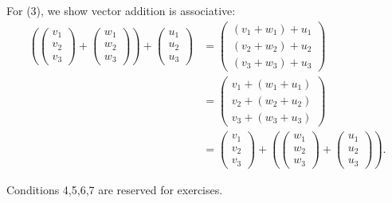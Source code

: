 \begin {example}{}
For (3), we show vector addition is associative:
\begin{align*}
\left( \left(\begin{array}{c}v_1\\v_2\\v_3\end{array}\right) + \left(\begin{array}{c}w_1\\w_2\\w_3\end{array}\right) \right) + \left(\begin{array}{c}u_1\\u_2\\u_3\end{array}\right) &= \left(\begin{array}{c}(v_1+w_1)+u_1\\(v_2+w_2)+u_2\\(v_3+w_3)+u_3\end{array}\right) \\
&= \left(\begin{array}{c}v_1+(w_1+u_1)\\v_2+(w_2+u_2)\\v_3+(w_3+u_3)\end{array}\right) \\
& =  \left(\begin{array}{c}v_1\\v_2\\v_3\end{array}\right) + \left( \left(\begin{array}{c}w_1\\w_2\\w_3\end{array}\right)   + \left(\begin{array}{c}u_1\\u_2\\u_3\end{array}\right) \right).
\end{align*}
\end{example}

Conditions 4,5,6,7 are reserved for exercises.

